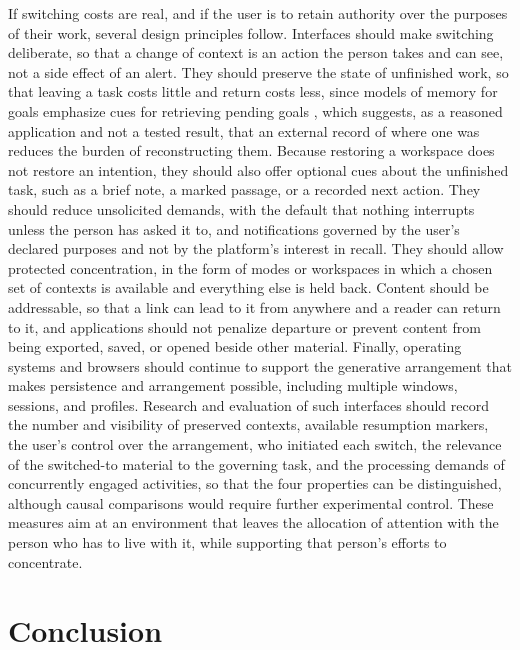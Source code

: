 \documentclass[12pt]{article}
\begin{document}
If switching costs are real, and if the user is to retain authority over the purposes of their work, several design principles follow. Interfaces should make switching deliberate, so that a change of context is an action the person takes and can see, not a side effect of an alert. They should preserve the state of unfinished work, so that leaving a task costs little and return costs less, since models of memory for goals emphasize cues for retrieving pending goals \cite{altmann2002memory}, which suggests, as a reasoned application and not a tested result, that an external record of where one was reduces the burden of reconstructing them. Because restoring a workspace does not restore an intention, they should also offer optional cues about the unfinished task, such as a brief note, a marked passage, or a recorded next action. They should reduce unsolicited demands, with the default that nothing interrupts unless the person has asked it to, and notifications governed by the user's declared purposes and not by the platform's interest in recall. They should allow protected concentration, in the form of modes or workspaces in which a chosen set of contexts is available and everything else is held back. Content should be addressable, so that a link can lead to it from anywhere and a reader can return to it, and applications should not penalize departure or prevent content from being exported, saved, or opened beside other material. Finally, operating systems and browsers should continue to support the generative arrangement that makes persistence and arrangement possible, including multiple windows, sessions, and profiles. Research and evaluation of such interfaces should record the number and visibility of preserved contexts, available resumption markers, the user's control over the arrangement, who initiated each switch, the relevance of the switched-to material to the governing task, and the processing demands of concurrently engaged activities, so that the four properties can be distinguished, although causal comparisons would require further experimental control. These measures aim at an environment that leaves the allocation of attention with the person who has to live with it, while supporting that person's efforts to concentrate.

\section{Conclusion}
\end{document}
